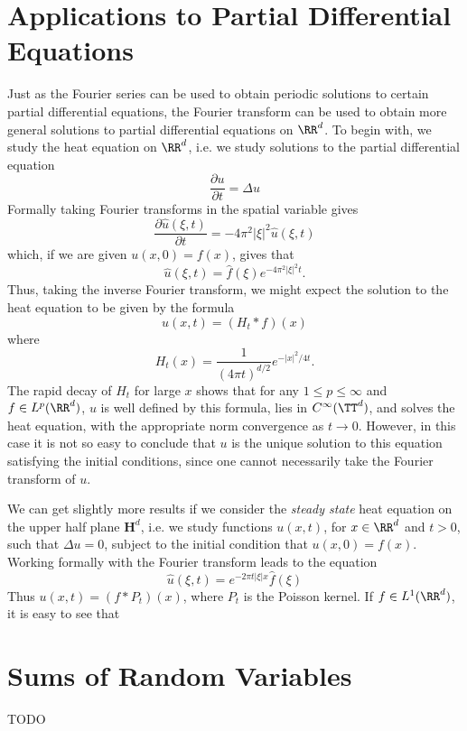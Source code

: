 \section{Applications to Partial Differential Equations}

Just as the Fourier series can be used to obtain periodic solutions to certain partial differential equations, the Fourier transform can be used to obtain more general solutions to partial differential equations on $\RR^d$. To begin with, we study the heat equation on $\RR^d$, i.e. we study solutions to the partial differential equation
%
\[ \frac{\partial u}{\partial t} = \Delta u \]
%
Formally taking Fourier transforms in the spatial variable gives
%
\[ \frac{\partial \widehat{u}(\xi,t)}{\partial t} = - 4 \pi^2 |\xi|^2 \widehat{u}(\xi,t) \]
%
which, if we are given $u(x,0) = f(x)$, gives that
%
\[ \widehat{u}(\xi,t) = \widehat{f}(\xi) e^{- 4 \pi^2 |\xi|^2 t}. \]
%
Thus, taking the inverse Fourier transform, we might expect the solution to the heat equation to be given by the formula
%
\[ u(x,t) = (H_t * f)(x) \]
%
where
%
\[ H_t(x) = \frac{1}{(4 \pi t)^{d/2}} e^{- |x|^2 / 4 t}. \]
%
The rapid decay of $H_t$ for large $x$ shows that for any $1 \leq p \leq \infty$ and $f \in L^p(\RR^d)$, $u$ is well defined by this formula, lies in $C^\infty(\TT^d)$, and solves the heat equation, with the appropriate norm convergence as $t \to 0$. However, in this case it is not so easy to conclude that $u$ is the unique solution to this equation satisfying the initial conditions, since one cannot necessarily take the Fourier transform of $u$.

We can get slightly more results if we consider the \emph{steady state} heat equation on the upper half plane $\mathbf{H}^d$, i.e. we study functions $u(x,t)$, for $x \in \RR^d$ and $t > 0$, such that $\Delta u = 0$, subject to the initial condition that $u(x,0) = f(x)$. Working formally with the Fourier transform leads to the equation
%
\[ \widehat{u}(\xi,t) = e^{-2 \pi t |\xi| x} \widehat{f}(\xi) \]
%
Thus $u(x,t) = (f * P_t)(x)$, where $P_t$ is the Poisson kernel. If $f \in L^1(\RR^d)$, it is easy to see that 


\section{Sums of Random Variables}

TODO

